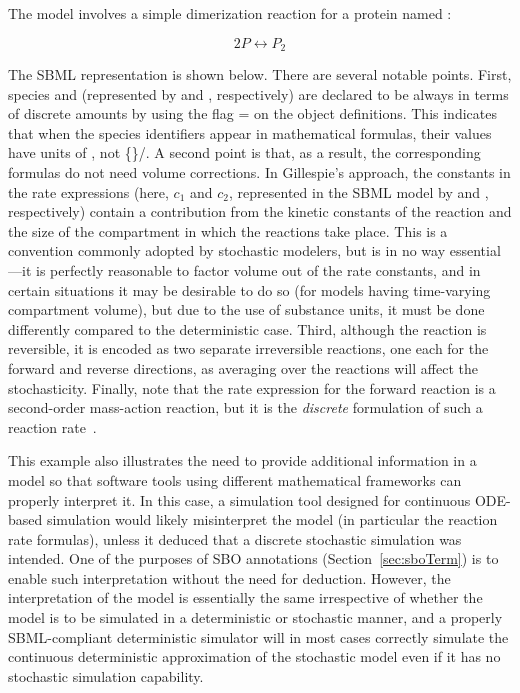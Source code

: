 The model involves a simple dimerization reaction for a protein
named :
\begin{linenomath}
\begin{equation*}
    2 P  \leftrightarrow  P_2
\end{equation*}
\end{linenomath}
The SBML representation is shown below.  There are several notable
points.  First, species  and  (represented
by  and , respectively) are declared to be always
in terms of discrete amounts by using the flag
= on the \Species object
definitions.  This indicates that when the species identifiers
appear in mathematical formulas, their values have units of
, not \{\}/.  A second point is that, as a result,
the corresponding \KineticLaw formulas do not need volume
corrections.  In Gillespie's approach, the constants in the rate
expressions (here, $c_1$ and $c_2$, represented in the SBML model
by  and , respectively) contain a contribution
from the kinetic constants of the reaction and the size of the
compartment in which the reactions take place.  This is a
convention commonly adopted by stochastic modelers, but is in no
way essential---it is perfectly reasonable to factor volume out of
the rate constants, and in certain situations it may be desirable
to do so (\eg for models having time-varying compartment volume),
but due to the use of substance units, it must be done differently
compared to the deterministic case.  Third, although the reaction
is reversible, it is encoded as two separate irreversible
reactions, one each for the forward and reverse directions, as
averaging over the reactions will affect the stochasticity.
Finally, note that the rate expression for the forward reaction is
a second-order mass-action reaction, but it is the \emph{discrete}
formulation of such a reaction rate~\citep{gillespie:1977}.


This example also illustrates the need to provide additional
information in a model so that software tools using different
mathematical frameworks can properly interpret it.  In this case,
a simulation tool designed for continuous ODE-based simulation
would likely misinterpret the model (in particular the reaction
rate formulas), unless it deduced that a discrete stochastic
simulation was intended.  One of the purposes of SBO annotations
(Section~\ref{sec:sboTerm}) is to enable such interpretation
without the need for deduction. However, the interpretation of the
model is essentially the same irrespective of whether the model is
to be simulated in a deterministic or stochastic manner, and a
properly SBML-compliant deterministic simulator will in most cases
correctly simulate the continuous deterministic approximation
of the stochastic model even if it has no stochastic simulation
capability.

